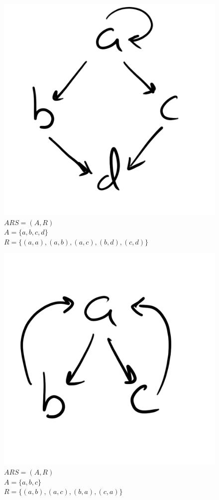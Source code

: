 \documentclass{article}
\begin{document}
\begin{figure}[H]
  \centering
  \includegraphics[scale=0.06]{gen15}
  \caption[] {
    $ARS = (A, R)$
    \\ $A=\{a, b, c, d\}$
    \\ $R=\{(a, a), (a, b), (a, c), (b, d), (c, d)\}$
    \endtabular}
\end{figure}

\begin{figure}[H]
  \centering
  \includegraphics[scale=0.06]{gen16}
  \caption[] {
    $ARS = (A, R)$
    \\ $A=\{a, b, c\}$
    \\ $R=\{(a, b), (a, c), (b, a), (c, a)\}$
    \endtabular}
\end{figure}
\end{document}
